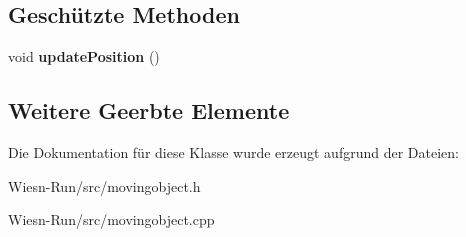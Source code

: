 \subsection*{Geschützte Methoden}
\begin{DoxyCompactItemize}
\item 
\hypertarget{classMovingObject_ad3305f90847ca544c780c91ac5351fc0}{void {\bfseries update\-Position} ()}\label{classMovingObject_ad3305f90847ca544c780c91ac5351fc0}

\end{DoxyCompactItemize}
\subsection*{Weitere Geerbte Elemente}


Die Dokumentation für diese Klasse wurde erzeugt aufgrund der Dateien\-:\begin{DoxyCompactItemize}
\item 
Wiesn-\/\-Run/src/movingobject.\-h\item 
Wiesn-\/\-Run/src/movingobject.\-cpp\end{DoxyCompactItemize}
